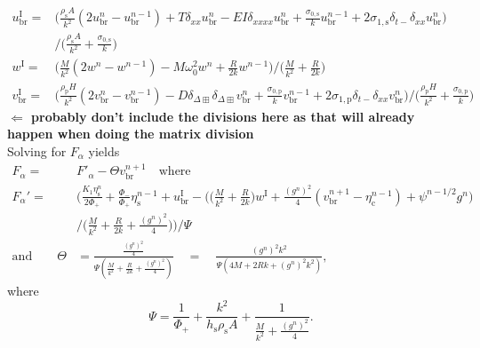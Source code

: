 \documentclass{article}
\begin{document}
\begin{subequations}\label{eq:intermediateDamp}
    \begin{align}
        u^\text{I}_\text{br} = &\Big(\frac{\rho_\text{s} A}{k^2}(2u_\text{br}^n-u_\text{br}^{n-1})+T\delta_{xx}u_\text{br}^n-EI\delta_{xxxx}u_\text{br}^n + \frac{\sigma_{0,\text{s}}}{k}u_\text{br}^{n-1} + 2\sigma_{1,\text{s}}\delta_{t-}\delta_{xx}u^n_\text{br}\Big)\\
        &/ \Big(\frac{\rho_\text{s}A}{k^2} + \frac{\sigma_{0,\text{s}}}{k}\Big) \nonumber\\
        w^\text{I} = & \Big(\frac{M}{k^2}(2w^n-w^{n-1})-M\omega_0^2w^n+\frac{R}{2k}w^{n-1}\Big) / \Big(\frac{M}{k^2} + \frac{R}{2k}\Big)\\
        v^\text{I}_{\text{br}} =& \Big(\frac{\rho_\text{p}H}{k^2}(2v_{\text{br}}^n-v_{\text{br}}^{n-1})-D\delta_{\Delta\boxplus}\delta_{\Delta\boxplus}v_{\text{br}}^n+\frac{\sigma_{0,\text{p}}}{k}v^{n-1}_\text{br}+ 2\sigma_{1,\text{p}}\delta_{t-}\delta_{xx}v^n_\text{br}\Big)/\Big(\frac{\rho_\text{p}H}{k^2}+\frac{\sigma_{0,\text{p}}}{k}\Big)
    \end{align}
\end{subequations}
\textbf{$\Leftarrow$ probably don't include the divisions here as that will already happen when doing the matrix division}\\
Solving for $F_\alpha$ yields
\begin{align}
    F_\alpha = &F'_\alpha - \Theta v^{n+1}_\text{br} \quad \text{where}\\
    F_\alpha' =& \Bigg(\frac{K_1\eta^n_\text{s}}{2\Phi_+}+\frac{\Phi_-}{\Phi_+}\eta_\text{s}^{n-1}+u^\text{I}_\text{br}-\bigg(\Big(\frac{M}{k^2}+\frac{R}{2k}\Big)w^\text{I}+\frac{(g^n)^2}{4}(v_\text{br}^{n+1}-\eta_\text{c}^{n-1})+\psi^{n-1/2}g^n\bigg)\\
    &/\bigg(\frac{M}{k^2}+\frac{R}{2k}+\frac{(g^n)^2}{4}\bigg)\Bigg)/\Psi\\
    \text{and} \quad \quad \Theta &= \frac{\frac{(g^n)^2}{4}}{\Psi(\frac{M}{k^2} + \frac{R}{2k} + \frac{(g^n)^2}{4})}\quad =\quad \frac{(g^n)^2 k^2}{\Psi (4M+2Rk+(g^n)^2k^2)},
\end{align}
where 
\begin{equation}
    \Psi = \frac{1}{\Phi_+} +  \frac{k^2}{h_\text{s}\rho_\text{s}A}+\frac{1}{\frac{M}{k^2}+\frac{(g^n)^2}{4}}.
\end{equation}
\end{document}
